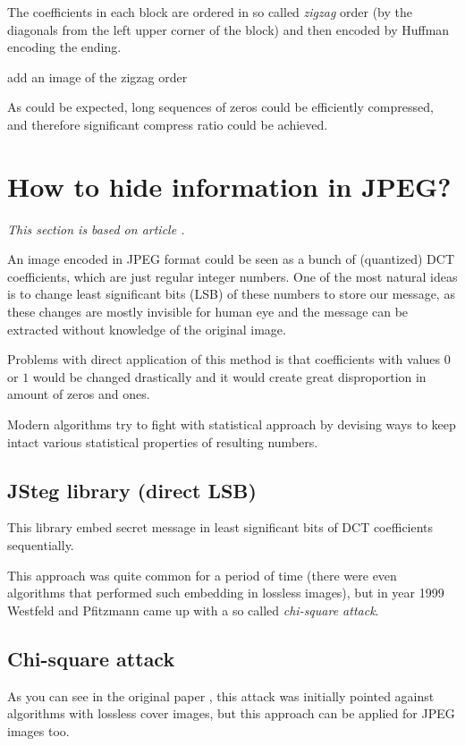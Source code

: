 The coefficients in each block are ordered in so called \emph{zigzag}
order (by the diagonals from the left upper corner of the block) and
then encoded by Huffman encoding \TODO the ending.

\TODO add an image of the zigzag order


As could be expected, long sequences of zeros could be efficiently
compressed, and therefore significant compress ratio could be achieved.


\section{How to hide information in JPEG?}
\label{sec:how-to-hide-information}

\textit{This section is based on article \cite{liu2008high}.}


An image encoded in JPEG format could be seen as a bunch of (quantized)
DCT coefficients, which are just regular integer numbers. One of the
most natural ideas is to change least significant bits (LSB) of these
numbers to store our message, as these changes are mostly invisible
for human eye and the message can be extracted without knowledge of
the original image.

Problems with direct application of this method is that coefficients with values
$0$ or $1$ would be changed drastically and it would create great disproportion
in amount of zeros and ones.

Modern algorithms try to fight with statistical approach by devising ways to
keep intact various statistical properties of resulting numbers. 

\subsection{JSteg library (direct LSB)}

This library embed secret message in least significant bits of DCT coefficients sequentially.

This approach was quite common for a period of time (there were even algorithms that performed such embedding
in lossless images), but in year 1999 Westfeld and Pfitzmann came up with a so called \textit{chi-square attack}.

\subsection{Chi-square attack}

As you can see in the original paper \cite{westfeld1999attacks}, 
this attack was initially pointed against algorithms with lossless cover images, 
but this approach can be applied for JPEG images too.

